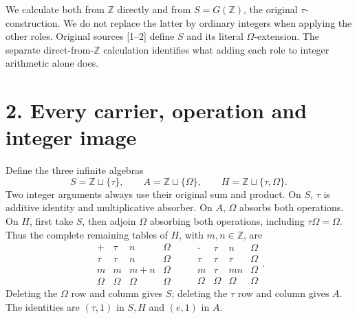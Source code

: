 \documentclass[
]{article}
\begin{document}
We calculate both from \(\mathbb Z\) directly and from
\(S=G(\mathbb Z)\), the original \(\tau\)-construction. We do not
replace the latter by ordinary integers when applying the other roles.
Original sources {[}1--2{]} define \(S\) and its literal
\(\Omega\)-extension. The separate direct-from-\(\mathbb Z\) calculation
identifies what adding each role to integer arithmetic alone does.

\section{2. Every carrier, operation and integer
image}\label{every-carrier-operation-and-integer-image}

Define the three infinite algebras \[
S=\mathbb Z\sqcup\{\tau\},\qquad
A=\mathbb Z\sqcup\{\Omega\},\qquad
H=\mathbb Z\sqcup\{\tau,\Omega\}.
\tag{Z1}
\] Two integer arguments always use their original sum and product. On
\(S\), \(\tau\) is additive identity and multiplicative absorber. On
\(A\), \(\Omega\) absorbs both operations. On \(H\), first take \(S\),
then adjoin \(\Omega\) absorbing both operations, including
\(\tau\Omega=\Omega\). Thus the complete remaining tables of \(H\), with
\(m,n\in\mathbb Z\), are \[
\begin{array}{c|ccc}
+&\tau&n&\Omega\\\hline
\tau&\tau&n&\Omega\\
m&m&m+n&\Omega\\
\Omega&\Omega&\Omega&\Omega
\end{array}
\qquad
\begin{array}{c|ccc}
\cdot&\tau&n&\Omega\\\hline
\tau&\tau&\tau&\Omega\\
m&\tau&mn&\Omega\\
\Omega&\Omega&\Omega&\Omega
\end{array}.
\tag{Z2}
\] Deleting the \(\Omega\) row and column gives \(S\); deleting the
\(\tau\) row and column gives \(A\). The identities are \((\tau,1)\) in
\(S,H\) and \((e,1)\) in \(A\).
\end{document}
